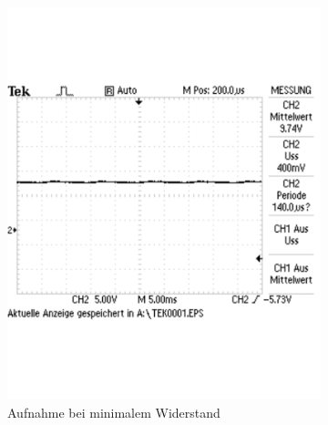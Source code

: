 \documentclass[12pt,a4paper]{article}
\begin{document}
\begin{figure}[H]
        \centering
        \begin{subfigure}[b]{0.48\textwidth}
                \includegraphics[width=\textwidth , scale = 0.4]{3_1_1.pdf}
                \caption[Aufnahme bei minimalem Widerstand]{Aufnahme bei minimalem Widerstand}
 				 \label{fig:3_1_1}
        \end{subfigure}%
        \hfill
        \begin{subfigure}[b]{0.48\textwidth}

\end{subfigure}
\end{figure}
\end{document}
